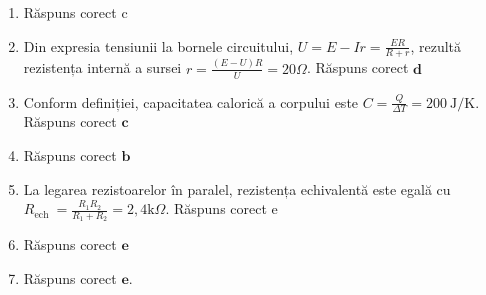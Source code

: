 \begin{enumerate}
  \item Răspuns corect c
  \item Din expresia tensiunii la bornele circuitului, $U=E-I r=\frac{E R}{R+r}$, rezultă rezistența internă a sursei $r=\frac{(E-U) R}{U}=20 \Omega$. Răspuns corect $\boldsymbol{d}$
  \item Conform definiției, capacitatea calorică a corpului este $C=\frac{Q}{\Delta T}=200 \mathrm{~J} / \mathrm{K}$. Răspuns corect $\boldsymbol{c}$
  \item Răspuns corect $\boldsymbol{b}$
  \item La legarea rezistoarelor în paralel, rezistența echivalentă este egală cu $R_{\text {ech }}=\frac{R_{1} R_{2}}{R_{1}+R_{2}}=2,4 \mathrm{k} \Omega$. Răspuns corect e
  \item Răspuns corect $\boldsymbol{e}$
  \item Răspuns corect $\boldsymbol{e}$.
\end{enumerate}

